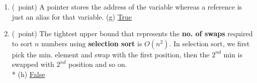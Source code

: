 \documentclass[14pt]{article}
\begin{document}
\begin{enumerate}[label=\alph*)]
    \item (\textonequarter\ point) A pointer stores the address of the variable whereas a reference is just an alias for that variable.
    \hfill (g) \underline{\hspace{2cm}True\hspace{2cm}}
    
    \item (\textonequarter\ point) The tightest upper bound that represents the \textbf{no. of swaps} required to sort $n$ numbers using \textbf{selection sort} is $O(n^2)$. In selection sort, we first pick the min. element and swap with the first position, then the $2^{nd}$ min is swapped with $2^{nd}$ position and so on. \\*
    \hfill (h) \underline{\hspace{2cm}False\hspace{2cm}}
\end{enumerate}
\end{document}
